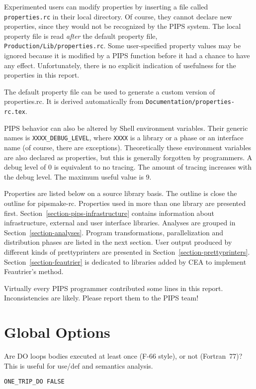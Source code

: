 Experimented users can modify properties by inserting a file called
\verb+properties.rc+ in their local directory. Of course, they cannot
declare new properties, since they would not be recognized by the PIPS
system. The local property file is read {\em after} the default property
file, \verb+Production/Lib/properties.rc+. Some user-specified property
values may be ignored because it is modified by a PIPS function before
it had a chance to have any effect. Unfortunately, there is no explicit
indication of usefulness for the properties in this report.

The default property file can be used to generate a custom version of
properties.rc. It is derived automatically from
\verb+Documentation/properties-rc.tex+.

PIPS behavior can also be altered by Shell environment variables. Their
generic names is \verb+XXXX_DEBUG_LEVEL+, where \verb+XXXX+ is a library
or a phase or an interface name (of course, there are
exceptions). Theoretically these environment variables are also declared
as properties, but this is generally forgotten by programmers. A debug
level of 0 is equivalent to no tracing. The amount of tracing increases
with the debug level. The maximum useful value is 9.

Properties are listed below on a source library basis. The outline is
close the outline for pipsmake-rc\cite{}.  Properties used in more than
one library are presented
first. Section~\ref{section-pips-infrastructure} contains information
about infrastructure, external and user interface libraries. Analyses
are grouped in Section~\ref{section-analyses}. Program transformations,
parallelization and distribution phases are listed in the next
section. User output produced by different kinds of prettyprinters are
presented in
Section~\ref{section-prettyprinters}. Section~\ref{section-feautrier} is
dedicated to libraries added by CEA to implement Feautrier's method.

Virtually every PIPS programmer contributed some lines in this
report. Inconsistencies are likely. Please report them to the PIPS team!

\section{Global Options}

Are DO loops bodies executed at least once (F-66 style), or not (Fortran~77)?
This is useful for use/def and semantics analysis.

\begin{verbatim}
ONE_TRIP_DO FALSE
\end{verbatim}

